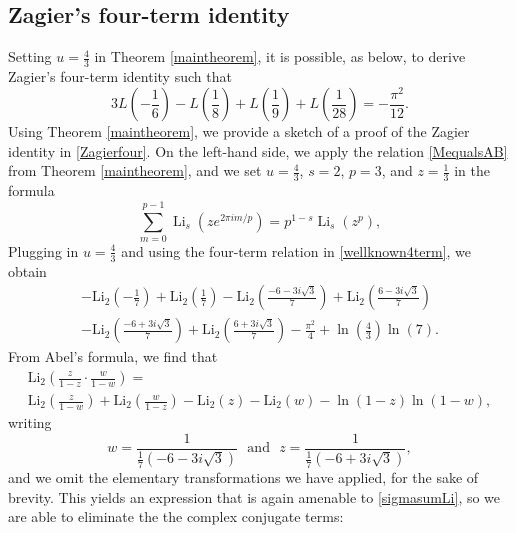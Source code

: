 \documentclass[12pt]{article}
\begin{document}
\subsection{Zagier's four-term identity}
 Setting $u = \frac{4}{3}$ in 
 Theorem \ref{maintheorem}, it is possible, as below, to derive Zagier's four-term identity such that 
 \begin{equation}\label{Zagierfour}
 3 L\left(-\frac{1}{6}\right) - L\left(\frac{1}{8}\right) + L \left(\frac{1}{9}\right) + L \left(\frac{1}{28}\right) = -\frac{\pi^2}{12}. 
\end{equation}
 Using Theorem \ref{maintheorem}, we 
 provide a sketch of a proof of the Zagier identity in \eqref{Zagierfour}. On the left-hand side, 
 we apply the relation \eqref{MequalsAB} from Theorem \ref{maintheorem}, and we set $u = 
 \frac{4}{3}$, $s = 2$, $p = 3$, and $z = 
 \frac{1}{3}$ in the formula 
\begin{equation}\label{sigmasumLi}
\sum_{m=0}^{p-1} \operatorname{Li}_s(z e^{2\pi i m/p}) = p^{1-s} \operatorname{Li}_s(z^p),
\end{equation}
 Plugging in $u = \frac{4}{3}$ and using the four-term relation in \eqref{wellknown4term}, we obtain 
 \begin{multline*}
 - \mathrm{Li}_2\left(-\frac{1}{7}\right) + \mathrm{Li}_2\left(\frac{1}{7}\right) 
 - \mathrm{Li}_2\left(\frac{-6 - 3i\sqrt{3}}{7}\right) 
 + \mathrm{Li}_2\left(\frac{6 - 3i\sqrt{3}}{7}\right) \\ 
 - \mathrm{Li}_2\left(\frac{-6 + 3i\sqrt{3}}{7}\right) 
 + \mathrm{Li}_2\left(\frac{6 + 3i\sqrt{3}}{7}\right) 
 - \frac{\pi^2}{4} + \ln\left(\frac{4}{3}\right)\ln(7). 
\end{multline*}
 From Abel's formula, we find that 
\begin{multline*}
 \mathrm{Li}_2\left(\frac{z}{1 - z} \cdot \frac{w}{1 - w}\right) = \\
 \mathrm{Li}_2\left(\frac{z}{1 - w}\right) 
 + \mathrm{Li}_2\left(\frac{w}{1 - z}\right) 
 - \mathrm{Li}_2(z) - \mathrm{Li}_2(w) 
 - \ln(1 - z)\ln(1 - w), 
\end{multline*}
 writing 
\begin{equation*}
w = \frac{1}{\frac{1}{7}\left(-6 - 3i\sqrt{3}\right)} \ \ \ \text{and} \ \ \ 
z = \frac{1}{\frac{1}{7}\left(-6 + 3i\sqrt{3}\right)}, 
 \end{equation*}
 and we omit the elementary transformations we have applied, for the sake of brevity. This yields an expression that is again amenable 
 to \eqref{sigmasumLi}, so we are able to eliminate the the complex conjugate terms: 
\end{document}
